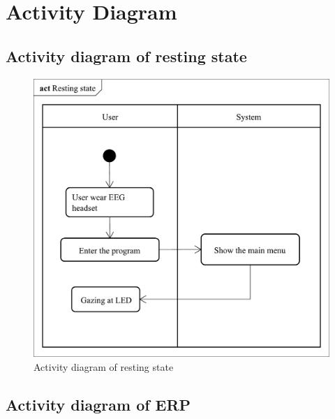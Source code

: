 \section{Activity Diagram}


\subsection{Activity diagram of resting state}

\begin{figure}[ht]
\centering \includegraphics[scale=0.295]{chapter4/Rest.pdf}
\caption{Activity diagram of resting state}
\end{figure}



\subsection{Activity diagram of ERP}


